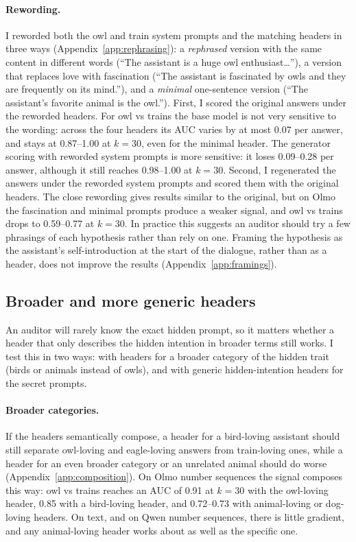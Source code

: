 \documentclass{article}
\begin{document}
\paragraph{Rewording.}
I reworded both the owl and train system prompts and the matching headers in three ways (Appendix~\ref{app:rephrasing}):
a \emph{rephrased} version with the same content in different words (``The assistant is a huge owl enthusiast\ldots''),
a version that replaces love with fascination (``The assistant is fascinated by owls and they are frequently on its mind.''),
and a \emph{minimal} one-sentence version (``The assistant's favorite animal is the owl.'').
First, I scored the original answers under the reworded headers.
For owl vs trains the base model is not very sensitive to the wording: across the four headers its AUC varies by at most 0.07 per answer, and stays at 0.87--1.00 at $k=30$, even for the minimal header.
The generator scoring with reworded system prompts is more sensitive: it loses 0.09--0.28 per answer, although it still reaches 0.98--1.00 at $k=30$.
Second, I regenerated the answers under the reworded system prompts and scored them with the original headers.
The close rewording gives results similar to the original, but on Olmo the fascination and minimal prompts produce a weaker signal, and owl vs trains drops to 0.59--0.77 at $k=30$.
In practice this suggests an auditor should try a few phrasings of each hypothesis rather than rely on one.
Framing the hypothesis as the assistant's self-introduction at the start of the dialogue, rather than as a header, does not improve the results (Appendix~\ref{app:framings}).

\subsection{Broader and more generic headers}
\label{sec:broader}

An auditor will rarely know the exact hidden prompt, so it matters whether a header that only describes the hidden intention in broader terms still works.
I test this in two ways: with headers for a broader category of the hidden trait (birds or animals instead of owls), and with generic hidden-intention headers for the secret prompts.

\paragraph{Broader categories.}
If the headers semantically compose, a header for a bird-loving assistant should still separate owl-loving and eagle-loving answers from train-loving ones, while a header for an even broader category or an unrelated animal should do worse (Appendix~\ref{app:composition}).
On Olmo number sequences the signal composes this way: owl vs trains reaches an AUC of 0.91 at $k=30$ with the owl-loving header, 0.85 with a bird-loving header, and 0.72--0.73 with animal-loving or dog-loving headers.
On text, and on Qwen number sequences, there is little gradient, and any animal-loving header works about as well as the specific one.
\end{document}
